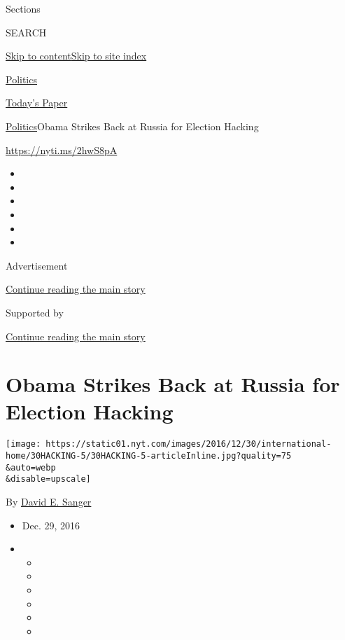 Sections

SEARCH

\protect\hyperlink{site-content}{Skip to
content}\protect\hyperlink{site-index}{Skip to site index}

\href{https://www.nytimes.com/section/politics}{Politics}

\href{https://myaccount.nytimes.com/auth/login?response_type=cookie\&client_id=vi}{}

\href{https://www.nytimes.com/section/todayspaper}{Today's Paper}

\href{/section/politics}{Politics}\textbar{}Obama Strikes Back at Russia
for Election Hacking

\url{https://nyti.ms/2hwS8pA}

\begin{itemize}
\item
\item
\item
\item
\item
\item
\end{itemize}

Advertisement

\protect\hyperlink{after-top}{Continue reading the main story}

Supported by

\protect\hyperlink{after-sponsor}{Continue reading the main story}

\hypertarget{obama-strikes-back-at-russia-for-election-hacking}{%
\section{Obama Strikes Back at Russia for Election
Hacking}\label{obama-strikes-back-at-russia-for-election-hacking}}

\texttt{[image: https://static01.nyt.com/images/2016/12/30/international-home/30HACKING-5/30HACKING-5-articleInline.jpg?quality=75\\\&auto=webp\\\&disable=upscale]}

By \href{http://www.nytimes.com/by/david-e-sanger}{David E. Sanger}

\begin{itemize}
\item
  Dec. 29, 2016
\item
  \begin{itemize}
  \item
  \item
  \item
  \item
  \item
  \item
  \end{itemize}
\end{itemize}


